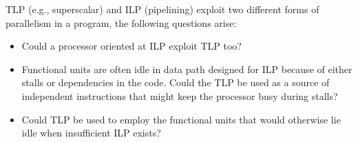 TLP (e.g., superscalar) and ILP (pipelining) exploit two different forms of parallelism in a program, the
following questions arise:
\begin{itemize}
    \item Could a processor oriented at ILP exploit TLP too?
    \item Functional units are often idle in data path designed for ILP because of either stalls or dependencies in
    the code.
    Could the TLP be used as a source of independent instructions that might keep the processor busy during stalls?
    \item Could TLP be used to employ the functional units that would otherwise lie idle when insufficient ILP exists?
\end{itemize}